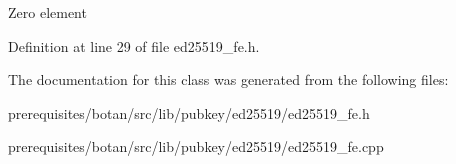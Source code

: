 Zero element 

Definition at line 29 of file ed25519\+\_\+fe.\+h.



The documentation for this class was generated from the following files\+:\begin{DoxyCompactItemize}
\item 
prerequisites/botan/src/lib/pubkey/ed25519/ed25519\+\_\+fe.\+h\item 
prerequisites/botan/src/lib/pubkey/ed25519/ed25519\+\_\+fe.\+cpp\end{DoxyCompactItemize}
